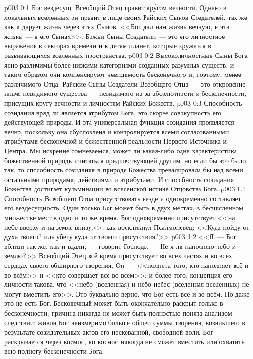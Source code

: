 \author{Божественный Советник}
\vs p003 0:1 Бог вездесущ; Всеобщий Отец правит кр\'угом вечности. Однако в локальных вселенных он правит в лице своих Райских Сынов Создателей, так же как и дарует жизнь через этих Сынов. <<Бог дал нам жизнь вечную, и эта жизнь~--- в его Сынах>>. Божьи Сыны Создатели~--- это его личностное выражение в секторах времени и к детям планет, которые кружатся в развивающихся вселенных пространства.
\vs p003 0:2 Высоколичностные Сыны Бога ясно различимы более низкими категориями созданных разумных существ, и таким образом они компенсируют невидимость бесконечного и, поэтому, менее различимого Отца. Райские Сыны Создатели Всеобщего Отца~--- это откровение иначе невидимого существа~--- невидимого из\hyp{}за абсолютности и бесконечности, присущих кругу вечности и личностям Райских Божеств.
\vs p003 0:3 \pc Способность созидания вряд ли является атрибутом Бога; это скорее совокупность его действующей природы. И эта универсальная функция созидания проявляется вечно, поскольку она обусловлена и контролируется всеми согласованными атрибутами бесконечной и божественной реальности Первого Источника и Центра. Мы искренне сомневаемся, может ли какая\hyp{}либо одна характеристика божественной природы считаться предшествующей другим, но если бы это было так, то способность созидания в природе Божества превалировала бы над всеми остальными природами, действиями и атрибутами. И способность созидания Божества достигает кульминации во вселенской истине Отцовства Бога.
\vs p003 1:1 Способность Всеобщего Отца присутствовать везде и одновременно составляет его вездесущность. Один только Бог может быть в двух местах, в бесчисленном множестве мест в одно и то же время. Бог одновременно присутствует <<на небе вверху и на земле внизу>>; как воскликнул Псалмопевец: <<Куда пойду от духа твоего? иль убегу куда от твоего присутствия?>>
\vs p003 1:2 <<Я~--- Бог вблизи так же, как и вдали,~--- говорит Господь. --- Не я ли наполняю небо и землю?>> Всеобщий Отец всё время присутствует во всех частях и во всех сердцах своего обширного творения. Он~--- <<полнота того, кто наполняет всё и во всём>> и <<кто совершает всё во всём>>; и более того, концепция его личности такова, что <<небо (вселенная) и небо небес (вселенная вселенных) не могут вместить его>>. Это буквально верно, что Бог есть всё и во всём. Но даже это не есть  Бог. Бесконечный может быть окончательно раскрыт только в бесконечности; причина никогда не может быть полностью понята анализом следствий; живой Бог неизмеримо больше общей суммы творения, возникшего в результате созидательных актов его нескованной, свободной воли. Бог раскрывается через космос, но космос никогда не сможет вместить или охватить всю полноту бесконечности Бога.
